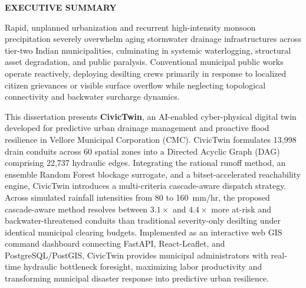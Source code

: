 \thispagestyle{plain}
\begin{center}
    {\fontsize{14pt}{18pt}\selectfont \textbf{EXECUTIVE SUMMARY}\par}
\end{center}
\vspace{0.8cm}

\noindent Rapid, unplanned urbanization and recurrent high-intensity monsoon precipitation severely overwhelm aging stormwater drainage infrastructures across tier-two Indian municipalities, culminating in systemic waterlogging, structural asset degradation, and public paralysis. Conventional municipal public works operate reactively, deploying desilting crews primarily in response to localized citizen grievances or visible surface overflow while neglecting topological connectivity and backwater surcharge dynamics. 

This dissertation presents \textbf{CivicTwin}, an AI-enabled cyber-physical digital twin developed for predictive urban drainage management and proactive flood resilience in Vellore Municipal Corporation (CMC). CivicTwin formulates 13,998 drain conduits across 60 spatial zones into a Directed Acyclic Graph (DAG) comprising 22,737 hydraulic edges. Integrating the rational runoff method, an ensemble Random Forest blockage surrogate, and a bitset-accelerated reachability engine, CivicTwin introduces a multi-criteria cascade-aware dispatch strategy. Across simulated rainfall intensities from 80 to 160~mm/hr, the proposed cascade-aware method resolves between $3.1\times$ and $4.4\times$ more at-risk and backwater-threatened conduits than traditional severity-only desilting under identical municipal clearing budgets. Implemented as an interactive web GIS command dashboard connecting FastAPI, React-Leaflet, and PostgreSQL/PostGIS, CivicTwin provides municipal administrators with real-time hydraulic bottleneck foresight, maximizing labor productivity and transforming municipal disaster response into predictive urban resilience.

\clearpage
